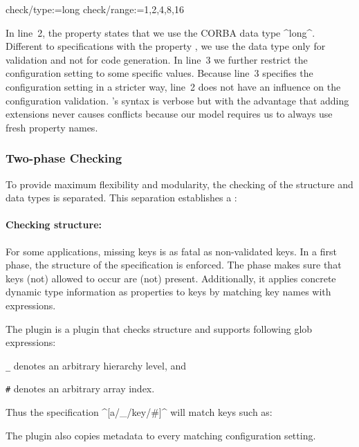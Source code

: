 \begin{code}
  check/type:=long
  check/range:=1,2,4,8,16
\end{code}

In line~2, the property  states that we use the CORBA data type ^long^.
Different to specifications with the property , we use the data type only for validation and not for code generation.
In line~3 we further restrict the configuration setting to some specific values.
Because line~3 specifies the configuration setting in a stricter way, line~2 does not have an influence on the configuration validation.
's syntax is verbose but with the advantage that adding extensions never causes conflicts because our model requires us to always use fresh property names.

\subsubsection{Two-phase Checking}


To provide maximum flexibility and modularity, the checking of the structure and data types is separated.
This separation establishes a :


\paragraph{Checking structure:}
For some applications, missing keys is as fatal as non-validated keys.
In a first phase, the structure of the specification is enforced.
The phase makes sure that keys (not) allowed to occur are (not) present.
Additionally, it applies concrete dynamic type information as properties to keys by matching key names with  expressions.
\begin{example}
The plugin  is a plugin that checks structure and supports following glob expressions:
\begin{description}
\item{\texttt{\_}} denotes an arbitrary hierarchy level, and
\item{\texttt{\#}} denotes an arbitrary array index.
\end{description}
Thus the specification ^[a/_/key/#]^ will match keys such as:


The plugin  also copies metadata to every matching configuration setting.
\end{example}

